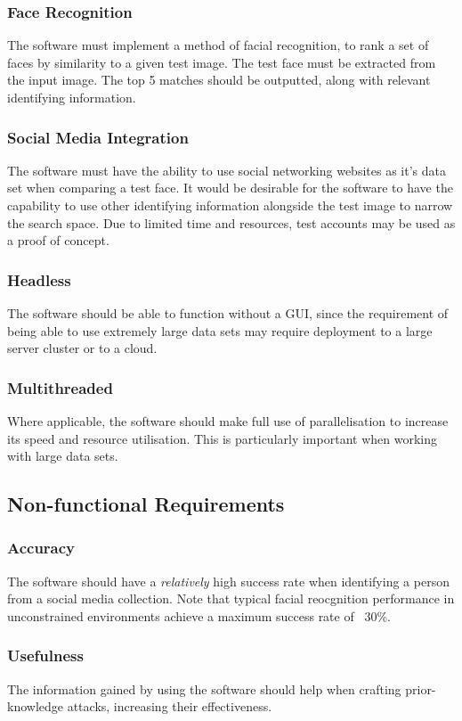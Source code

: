 \documentclass{article}
\begin{document}
\subsubsection{Face Recognition}
The software must implement a method of facial recognition, to rank a set of faces by similarity to a given test image. The test face must be extracted from the input image. The top 5 matches should be outputted, along with relevant identifying information.

\subsubsection{Social Media Integration}
The software must have the ability to use social networking websites as it's data set when comparing a test face. It would be desirable for the software to have the capability to use other identifying information alongside the test image to narrow the search space. Due to limited time and resources, test accounts may be used as a proof of concept.

\subsubsection{Headless}
The software should be able to function without a GUI, since the requirement of being able to use extremely large data sets may require deployment to a large server cluster or to a cloud.

\subsubsection{Multithreaded}
Where applicable, the software should make full use of parallelisation to increase its speed and resource utilisation. This is particularly important when working with large data sets.

\subsection{Non-functional Requirements}
\subsubsection{Accuracy}
The software should have a \textit{relatively} high success rate when identifying a person from a social media collection. Note that typical facial reocgnition performance in unconstrained environments achieve a maximum success rate of ~30\%.

\subsubsection{Usefulness}
The information gained by using the software should help when crafting prior-knowledge attacks, increasing their effectiveness.
\end{document}
